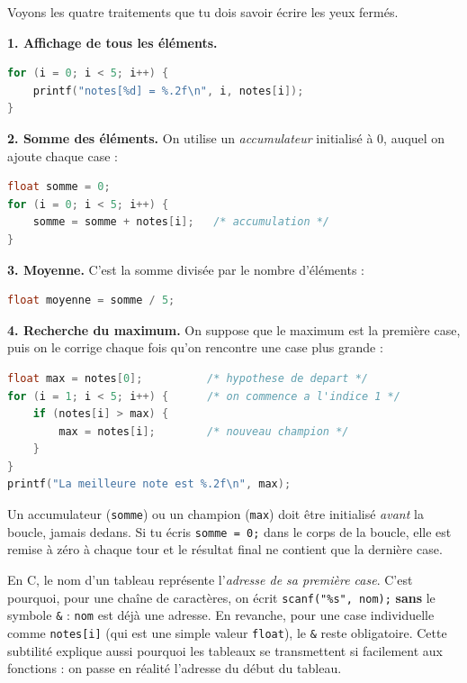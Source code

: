 \documentclass[11pt]{article}
\begin{document}
Voyons les quatre traitements que tu dois savoir écrire les yeux fermés.

\textbf{1. Affichage de tous les éléments.}

\begin{lstlisting}[language=C]
for (i = 0; i < 5; i++) {
    printf("notes[%d] = %.2f\n", i, notes[i]);
}
\end{lstlisting}

\textbf{2. Somme des éléments.} On utilise un \emph{accumulateur} initialisé à 0, auquel on ajoute chaque case :

\begin{lstlisting}[language=C]
float somme = 0;
for (i = 0; i < 5; i++) {
    somme = somme + notes[i];   /* accumulation */
}
\end{lstlisting}

\textbf{3. Moyenne.} C'est la somme divisée par le nombre d'éléments :

\begin{lstlisting}[language=C]
float moyenne = somme / 5;
\end{lstlisting}

\textbf{4. Recherche du maximum.} On suppose que le maximum est la première case, puis on le corrige chaque fois qu'on rencontre une case plus grande :

\begin{lstlisting}[language=C]
float max = notes[0];          /* hypothese de depart */
for (i = 1; i < 5; i++) {      /* on commence a l'indice 1 */
    if (notes[i] > max) {
        max = notes[i];        /* nouveau champion */
    }
}
printf("La meilleure note est %.2f\n", max);
\end{lstlisting}

\begin{attention}
Un accumulateur (\texttt{somme}) ou un champion (\texttt{max}) doit être initialisé \emph{avant} la boucle, jamais dedans. Si tu écris \texttt{somme = 0;} dans le corps de la boucle, elle est remise à zéro à chaque tour et le résultat final ne contient que la dernière case.
\end{attention}

\begin{savaistu}
En C, le nom d'un tableau représente l'\emph{adresse de sa première case}. C'est pourquoi, pour une chaîne de caractères, on écrit \texttt{scanf("\%s", nom);} \textbf{sans} le symbole \texttt{\&} : \texttt{nom} est déjà une adresse. En revanche, pour une case individuelle comme \texttt{notes[i]} (qui est une simple valeur \texttt{float}), le \texttt{\&} reste obligatoire. Cette subtilité explique aussi pourquoi les tableaux se transmettent si facilement aux fonctions : on passe en réalité l'adresse du début du tableau.
\end{savaistu}
\end{document}

